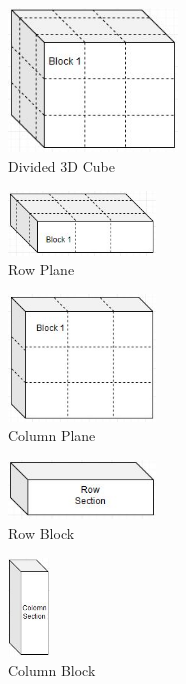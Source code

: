 \documentclass[a4paper, 11pt, onecolumn, conference]{IEEEtran}      %
\begin{document}
\begin{figure}[H]
\centering
\includegraphics[width=0.4\textwidth]{MatrixBlock.JPG}%
\caption{Divided 3D Cube}
\label{fig:1}
\end{figure}

\begin{figure}[H]
\centering
\includegraphics[width=0.35\textwidth]{VPlaneBlock.JPG}%
\caption{Row Plane}
\label{fig:2}
\end{figure}

\begin{figure}[H]
\centering
\includegraphics[width=0.35\textwidth]{MatrixPlane.JPG}%
\caption{Column Plane}
\label{fig:3}
\end{figure}

\begin{figure}[H]
\centering
\includegraphics[width=0.35\textwidth]{RowBlock.JPG}%
\caption{Row Block}
\label{fig:4}
\end{figure}

\begin{figure}[H]
\centering
\includegraphics[width=0.1\textwidth]{ColomnBlock.JPG}%
\caption{Column Block}
\label{fig:5}
\end{figure}
\end{document}
